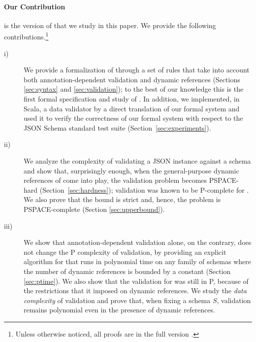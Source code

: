 \paragraph*{Our Contribution}\label{subsec:ourcontrib}

{\DTwenty} \citep{specs2020} is the version of {\mJS} that we study in this paper. We provide the following contributions.\footnote{Unless otherwise noticed, all proofs are in the full version \cite{attouche2023validation-arXiv}.}


\newcommand{\FV}{full version \cite{attouche2023validation-arXiv}}
\renewcommand{\FV}{full version}

\begin{description}

\item[i)]  We provide a formalization of {\mJS} through a set of rules that take into account both annotation-dependent validation and dynamic references (Sections \ref{sec:syntax} and  \ref{sec:validation});  to the best of our knowledge this is the first formal specification and study of {\mJS}.
In addition, we implemented, in Scala, a {\mJS} data validator by a direct translation of our formal system and used it to verify
the correctness of our formal system with respect to the JSON Schema standard test suite (Section~\ref{sec:experiments}).


\item[ii)] We analyze the complexity of validating a JSON instance against a schema and show that, surprisingly enough, when
the general-purpose dynamic references of {\DTwenty} come into play, the validation problem becomes PSPACE-hard (Section~\ref{sec:hardness}); validation was known to be P-complete for {\cJS} \citep{DBLP:conf/www/PezoaRSUV16,DBLP:conf/pods/BourhisRSV17}. We also prove that the bound is strict and, hence, the problem is PSPACE-complete (Section \ref{sec:upperbound}).

\item[iii)] We show that annotation-dependent validation alone, on the contrary, does not change the P complexity of validation, by providing an explicit algorithm for {\mJS} that runs in polynomial time on %
any family of schemas
   where the number of dynamic references is bounded by a constant (Section \ref{sec:ptime}). We also show that the validation for {\DNineteen} was still in P, because of the restrictions that it imposed on dynamic references.
      We study the \emph{data complexity} of validation and prove that, when fixing a schema $S$, validation remains polynomial even in the presence of dynamic references.  


\end{description}
